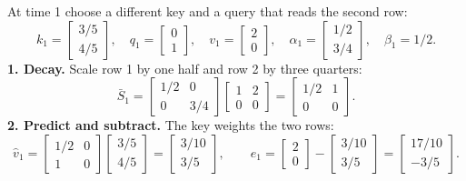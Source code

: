 \documentclass[10pt,letterpaper]{article}
\begin{document}
At time 1 choose a different key and a query that reads the second row:
\begin{equation}
k_1=\begin{bmatrix}3/5\\4/5\end{bmatrix},\quad q_1=\begin{bmatrix}0\\1\end{bmatrix},\quad
v_1=\begin{bmatrix}2\\0\end{bmatrix},\quad
\alpha_1=\begin{bmatrix}1/2\\3/4\end{bmatrix},\quad\beta_1=1/2.
\end{equation}
\textbf{1. Decay.} Scale row 1 by one half and row 2 by three quarters:
\begin{equation}
\bar S_1=\begin{bmatrix}1/2&0\\0&3/4\end{bmatrix}
\begin{bmatrix}1&2\\0&0\end{bmatrix}=\begin{bmatrix}1/2&1\\0&0\end{bmatrix}.
\end{equation}
\textbf{2. Predict and subtract.} The key weights the two rows:
\begin{equation}
\widehat v_1=\begin{bmatrix}1/2&0\\1&0\end{bmatrix}\begin{bmatrix}3/5\\4/5\end{bmatrix}
=\begin{bmatrix}3/10\\3/5\end{bmatrix},\qquad
e_1=\begin{bmatrix}2\\0\end{bmatrix}-\begin{bmatrix}3/10\\3/5\end{bmatrix}
=\begin{bmatrix}17/10\\-3/5\end{bmatrix}.
\end{equation}
\end{document}
